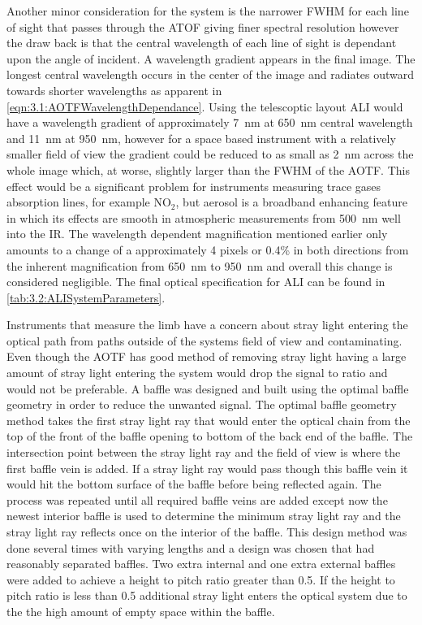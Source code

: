 \documentclass[12pt]{article}
\begin{document}
Another minor consideration for the system is the narrower FWHM for each line of sight that passes through the ATOF giving finer spectral resolution however the draw back is that the central wavelength of each line of sight is dependant upon the angle of incident. A wavelength gradient appears in the final image. The longest central wavelength occurs in the center of the image and radiates outward towards shorter wavelengths as apparent in \autoref{eqn:3.1:AOTFWavelengthDependance}. Using the telescoptic layout ALI would have a wavelength gradient of approximately 7~nm at 650~nm central wavelength and 11~nm at 950~nm, however for a space based instrument with a relatively smaller field of view the gradient could be reduced to as small as 2~nm across the whole image which, at worse, slightly larger than the FWHM of the AOTF. This effect would be a significant problem for instruments measuring trace gases absorption lines, for example NO$_{2}$, but aerosol is a broadband enhancing feature in which its effects are smooth in atmospheric measurements from 500~nm well into the IR. The wavelength dependent magnification mentioned earlier only amounts to a change of a approximately 4 pixels or 0.4\% in both directions from the inherent magnification from 650~nm to 950~nm and overall this change is considered negligible. The final optical specification for ALI can be found in \autoref{tab:3.2:ALISystemParameters}.

Instruments that measure the limb have a concern about stray light entering the optical path from paths outside of the systems field of view and contaminating. Even though the AOTF has good method of removing stray light having a large amount of stray light entering the system would drop the signal to ratio and would not be preferable. A baffle was designed and built using the optimal baffle geometry in order to reduce the unwanted signal. The optimal baffle geometry method takes the first stray light ray that would enter the optical chain from the top of the front of the baffle opening to bottom of the back end of the baffle. The intersection point between the stray light ray and the field of view is where the first baffle vein is added. If a stray light ray would pass though this baffle vein it would hit the bottom surface of the baffle before being reflected again. The process was repeated until all required baffle veins are added except now the newest interior baffle is used to determine the minimum stray light ray and the stray light ray reflects once on the interior of the baffle. This design method was done several times with varying lengths and a design was chosen that had reasonably separated baffles. Two extra internal and one extra external baffles were added to achieve a height to pitch ratio greater than 0.5. If the height to pitch ratio is less than 0.5 additional stray light enters the optical system due to the the high amount of empty space within the baffle.
\end{document}
